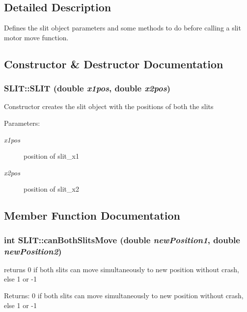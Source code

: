 \subsection{Detailed Description}
Defines the slit object parameters and some methods to do before calling a slit motor move function. 



\subsection{Constructor \& Destructor Documentation}
\subsubsection{\setlength{\rightskip}{0pt plus 5cm}SLIT::SLIT (double {\em x1pos}, double {\em x2pos})}\label{classSLIT_948e48d9410bb54fb949117d042a30b1}


Constructor creates the slit object with the positions of both the slits \begin{Desc}
\item[Parameters:]
\begin{description}
\item[{\em x1pos}]position of slit\_\-x1 \item[{\em x2pos}]position of slit\_\-x2 \end{description}
\end{Desc}


\subsection{Member Function Documentation}
\subsubsection{\setlength{\rightskip}{0pt plus 5cm}int SLIT::can\-Both\-Slits\-Move (double {\em new\-Position1}, double {\em new\-Position2})}\label{classSLIT_c87e899d21cc8bf0abf626e18aab37fd}


returns 0 if both slits can move simultaneously to new position without crash, else 1 or -1 \begin{Desc}
\item[Returns:]0 if both slits can move simultaneously to new position without crash, else 1 or -1 \end{Desc}
